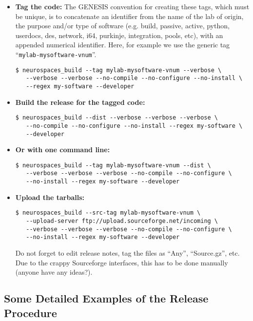 \documentclass[12pt]{article}
\begin{document}
\begin{itemize}

\item {\bf Tag the code:} The GENESIS convention for creating these tags, which must be unique, is to concatenate an identifier from the name of the lab of origin, the purpose and/or type of software (e.g. build, passive, active, python, userdocs, des, network, i64, purkinje, integration, pools, etc), with an appended numerical identifier. Here, for example we use the generic tag ``{\tt mylab-mysoftware-vnum}''.
\begin{verbatim}
$ neurospaces_build --tag mylab-mysoftware-vnum --verbose \
   --verbose --verbose --no-compile --no-configure --no-install \
   --regex my-software --developer
\end{verbatim}

\item {\bf Build the release for the tagged code:}
\begin{verbatim}
$ neurospaces_build --dist --verbose --verbose --verbose \
   --no-compile --no-configure --no-install --regex my-software \
   --developer
\end{verbatim}

\item {\bf Or with one command line:}
\begin{verbatim}
$ neurospaces_build --tag mylab-mysoftware-vnum --dist \
   --verbose --verbose --verbose --no-compile --no-configure \
   --no-install --regex my-software --developer
\end{verbatim}

\item {\bf Upload the tarballs:}
\begin{verbatim}
$ neurospaces_build --src-tag mylab-mysoftware-vnum \
   --upload-server ftp://upload.sourceforge.net/incoming \
   --verbose --verbose --verbose --no-compile --no-configure \
   --no-install --regex my-software --developer
\end{verbatim}
Do not forget to edit release notes, tag the files as ``Any'', ``Source.gz'', etc. Due to the crappy Sourceforge interfaces, this has to be done manually (anyone have any ideas?).

\end{itemize}


\subsection*{Some Detailed Examples of the Release Procedure}
\end{document}
